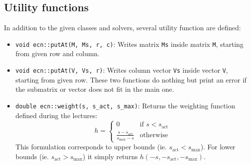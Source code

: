 \documentclass{ecnreport}
\begin{document}

% 

\subsection{Utility functions}
\label{util}

In addition to the given classes and solvers, several utility function are defined:
\begin{itemize}
 \item \texttt{void ecn::putAt(M, Ms, r, c)}: Writes matrix \texttt{Ms} inside matrix \texttt{M}, starting from given row and column.
 \item \texttt{void ecn::putAt(V, Vs, r)}: Writes column vector \texttt{Vs} inside vector \texttt{V}, starting from given row. These two functions do nothing but print an error
 if the submatrix or vector does not fit in the main one.
 \item \texttt{double ecn::weight(s, s\_act, s\_max)}: Returns the weighting function defined during the lectures:
 \begin{equation*}
  h = \left\{\begin{array}{cl}
              0 & \text{if } s < s_{\text{act}} \\
              \displaystyle \frac{s-s_{\text{act}}}{s_{\max}-s} & \text{otherwise}
             \end{array}\right.
 \end{equation*}This formulation corresponds to upper bounds (ie. $s_{\text{act}} < s_{\text{max}}$).
 For lower bounds (ie. $s_{\text{act}} > s_{\text{max}}$) it simply returns $h(-s,-s_{\text{act}}, -s_{\max})$.
\end{itemize}
\end{document}
